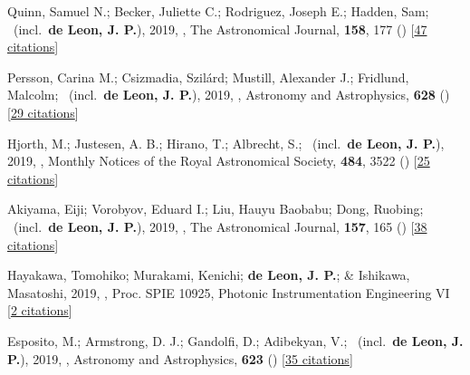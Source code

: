 \item[{\color{numcolor}\scriptsize15}] Quinn, Samuel N.; Becker, Juliette C.; Rodriguez, Joseph E.; Hadden, Sam; \etal\ (incl.\ \textbf{de Leon, J. P.}), 2019, , The Astronomical Journal, \textbf{158}, 177 () [\href{https://ui.adsabs.harvard.edu/abs/2019AJ....158..177Q}{47 citations}]

\item[{\color{numcolor}\scriptsize14}] Persson, Carina M.; Csizmadia, Szil{\'a}rd; Mustill, Alexander J.; Fridlund, Malcolm; \etal\ (incl.\ \textbf{de Leon, J. P.}), 2019, , Astronomy and Astrophysics, \textbf{628} () [\href{https://ui.adsabs.harvard.edu/abs/2019A&A...628A..64P}{29 citations}]

\item[{\color{numcolor}\scriptsize13}] Hjorth, M.; Justesen, A. B.; Hirano, T.; Albrecht, S.; \etal\ (incl.\ \textbf{de Leon, J. P.}), 2019, , Monthly Notices of the Royal Astronomical Society, \textbf{484}, 3522 () [\href{https://ui.adsabs.harvard.edu/abs/2019MNRAS.484.3522H}{25 citations}]

\item[{\color{numcolor}\scriptsize12}] Akiyama, Eiji; Vorobyov, Eduard I.; Liu, Hauyu Baobabu; Dong, Ruobing; \etal\ (incl.\ \textbf{de Leon, J. P.}), 2019, , The Astronomical Journal, \textbf{157}, 165 () [\href{https://ui.adsabs.harvard.edu/abs/2019AJ....157..165A}{38 citations}]

\item[{\color{numcolor}\scriptsize11}] Hayakawa, Tomohiko; Murakami, Kenichi; \textbf{de Leon, J. P.}; \& Ishikawa, Masatoshi, 2019, , Proc. SPIE 10925, Photonic Instrumentation Engineering VI [\href{https://www.spiedigitallibrary.org/conference-proceedings-of-spie/10925/1092507/Focus-adjustable-motion-blur-compensation-method-using-deformable-mirror/10.1117/12.2509567.short}{2 citations}]

\item[{\color{numcolor}\scriptsize10}] Esposito, M.; Armstrong, D. J.; Gandolfi, D.; Adibekyan, V.; \etal\ (incl.\ \textbf{de Leon, J. P.}), 2019, , Astronomy and Astrophysics, \textbf{623} () [\href{https://ui.adsabs.harvard.edu/abs/2019A&A...623A.165E}{35 citations}]


